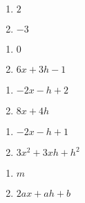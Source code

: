 \documentclass{ximera}
\begin{document}
	\author{Stitz-Zeager}



\label{ExercisesforFunctionArithmetic}


\begin{multicols}{2}
\begin{enumerate}
\setcounter{enumi}{\value{HW}}

\item $2$
\item $-3$

\setcounter{HW}{\value{enumi}}
\end{enumerate}
\end{multicols}

\begin{multicols}{2}
\begin{enumerate}
\setcounter{enumi}{\value{HW}}

\item $0$
\item $6x+3h-1$

\setcounter{HW}{\value{enumi}}
\end{enumerate}
\end{multicols}

\begin{multicols}{2}
\begin{enumerate}
\setcounter{enumi}{\value{HW}}

\item $-2x-h+2$
\item $8x+4h$

\setcounter{HW}{\value{enumi}}
\end{enumerate}
\end{multicols}

\begin{multicols}{2}
\begin{enumerate}
\setcounter{enumi}{\value{HW}}

\item $-2x-h+1$
\item $3x^{2} + 3xh + h^{2}$

\setcounter{HW}{\value{enumi}}
\end{enumerate}
\end{multicols}

\begin{multicols}{2}
\begin{enumerate}
\setcounter{enumi}{\value{HW}}

\item $m$
\item $2ax + ah + b$

\setcounter{HW}{\value{enumi}}
\end{enumerate}
\end{multicols}
\end{document}
